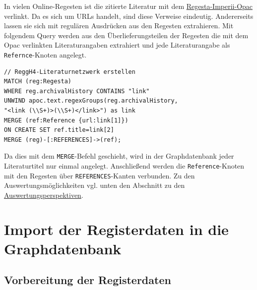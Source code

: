 \documentclass[ngerman,]{scrreprt}
\begin{document}
In vielen Online-Regesten ist die zitierte Literatur mit dem \href{http://opac.regesta-imperii.de/lang_de/}{Regesta-Imperii-Opac} verlinkt. Da es sich um URLs handelt, sind diese Verweise eindeutig. Andererseits lassen sie sich mit regulären Ausdrücken aus den Regesten extrahieren. Mit folgendem Query werden aus den Überlieferungsteilen der Regesten die mit dem Opac verlinkten Literaturangaben extrahiert und jede Literaturangabe als \texttt{Refernce}-Knoten angelegt.

\begin{verbatim}
// ReggH4-Literaturnetzwerk erstellen
MATCH (reg:Regesta)
WHERE reg.archivalHistory CONTAINS "link"
UNWIND apoc.text.regexGroups(reg.archivalHistory,
"<link (\\S+)>(\\S+)</link>") as link
MERGE (ref:Reference {url:link[1]})
ON CREATE SET ref.title=link[2]
MERGE (reg)-[:REFERENCES]->(ref);
\end{verbatim}

Da dies mit dem \texttt{MERGE}-Befehl geschieht, wird in der Graphdatenbank jeder Literaturtitel nur einmal angelegt. Anschließend werden die \texttt{Reference}-Knoten mit den Regesten über \texttt{REFERENCES}-Kanten verbunden. Zu den Auswertungsmöglichkeiten vgl. unten den Abschnitt zu den \protect\hyperlink{ux5cux23Auswertungsperspektiven}{Auswertungsperspektiven}.

\hypertarget{import-der-registerdaten-in-die-graphdatenbank}{%
\section{Import der Registerdaten in die Graphdatenbank}\label{import-der-registerdaten-in-die-graphdatenbank}}

\hypertarget{vorbereitung-der-registerdaten}{%
\subsection{Vorbereitung der Registerdaten}\label{vorbereitung-der-registerdaten}}
\end{document}
